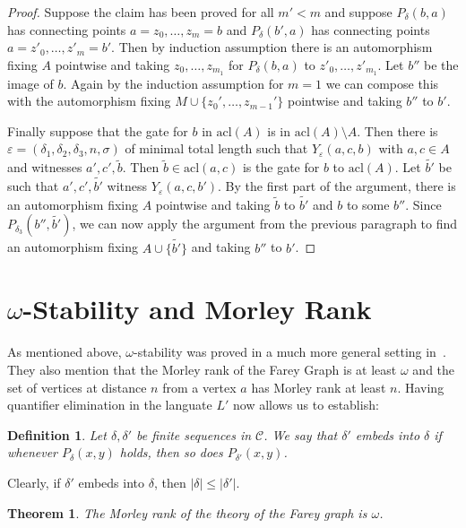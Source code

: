\documentclass[10pt,a4paper]{amsart}
\renewcommand{\d}{\delta}
\renewcommand{\epsilon}{\varepsilon}
\newcommand{\C}{\mathcal{C}}
\newcommand{\acl}{\mathrm{acl}}
\newtheorem{theorem}[defi]{Theorem}
\newtheorem{definition}[defi]{Definition}
\begin{document}
\begin{proof}
Suppose the claim has been proved for all $m'<m$ and suppose $P_\d(b,a)$ has connecting points $a=z_0,\ldots, z_m=b$ and $P_\d(b',a)$ has connecting points $a=z'_0,\ldots, z'_m=b'$. Then by induction assumption there is an automorphism fixing $A$ pointwise and  taking  $z_0,\ldots, z_{m_1}$ for $P_\d(b,a)$ to  $z'_0,\ldots, z'_{m_1}$. Let $b''$ be the image of $b$. Again by the induction assumption for $m=1$ we can compose this with the automorphism fixing $M\cup\{z_0',\ldots, z_{m-1}'\}$ pointwise and taking $b''$ to $b'$.

Finally suppose that the gate for $b$ in $\acl(A)$ is in $\acl(A)\setminus A$. Then there is $\epsilon=(\d_1,\d_2,\d_3,n,\sigma)$ of minimal total length such that $Y_\epsilon(a,c,b)$ with $a,c\in A$ and witnesses  $a',c',\tilde{b}$. Then $\tilde{b}\in\acl(a,c)$ is the gate for $b$ to $\acl(A)$. Let $\tilde{b'}$ be such that $a',c',\tilde{b'}$ witness $Y_\epsilon(a,c,b')$. By the first part of the argument, there is an automorphism fixing $A$ pointwise and taking $\tilde{b}$ to $\tilde{b'}$ and $b$ to some $b''$.
Since $P_{\d_3}(b'',\tilde{b'})$, we can now apply the argument from the previous paragraph to find an automorphism fixing $A\cup\{\tilde{b'}\}$
and taking $b''$ to $b'$.



\end{proof}
   \section{$\omega$-Stability and Morley Rank}

    
As mentioned above,   $\omega$-stability was proved in a much more general setting in~\cite{modeltheorycurvegraph}. They also mention
    that the Morley rank of the Farey Graph is at least $\omega$ and the set of vertices at distance $n$ from a vertex $a$ has Morley rank at least $n$. Having quantifier elimination in  the languate $L'$ now allows us to establish:
    
 \begin{definition}
Let $\d,\d'$ be finite sequences in $\C$. We say that $\d'$  \emph{embeds } into $\d$ if whenever $P_\d(x,y)$ holds, then so does $P_{\d'}(x,y)$.
\end{definition}
Clearly, if $\d'$ embeds into $\d$, then $|\d|\leq|\d'|$.



 \begin{theorem}\label{thm:omega}
     The Morley rank of the theory of the Farey graph is $\omega$.
 \end{theorem}
\end{document}
